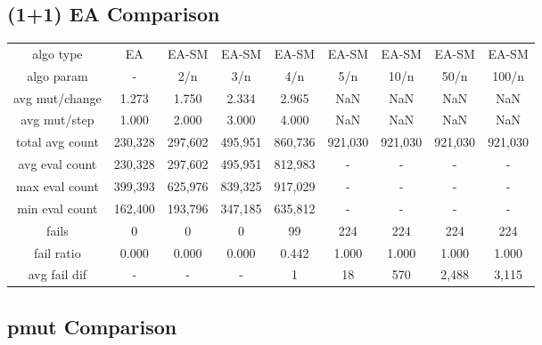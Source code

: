 
\subsection{(1+1) EA Comparison}


\begin{tabular}[h]{ccccccccc}
algo type&             EA&   EA-SM&   EA-SM&   EA-SM&   EA-SM&   EA-SM&   EA-SM&   EA-SM\\
algo param&             -&     2/n&     3/n&     4/n&     5/n&    10/n&    50/n&   100/n\\
avg mut/change&     1.273&   1.750&   2.334&   2.965&     NaN&     NaN&     NaN&     NaN\\
avg mut/step&       1.000&   2.000&   3.000&   4.000&     NaN&     NaN&     NaN&     NaN\\
\hline
total avg count&  230,328& 297,602& 495,951& 860,736& 921,030& 921,030& 921,030& 921,030\\
avg eval count&   230,328& 297,602& 495,951& 812,983&       -&       -&       -&       -\\
max eval count&   399,393& 625,976& 839,325& 917,029&       -&       -&       -&       -\\
min eval count&   162,400& 193,796& 347,185& 635,812&       -&       -&       -&       -\\
\hline
fails&                  0&       0&       0&      99&     224&     224&     224&     224\\
fail ratio&         0.000&   0.000&   0.000&   0.442&   1.000&   1.000&   1.000&   1.000\\
avg fail dif&           -&       -&       -&       1&      18&     570&   2,488&   3,115\\
\end{tabular}


\subsection{pmut Comparison}


